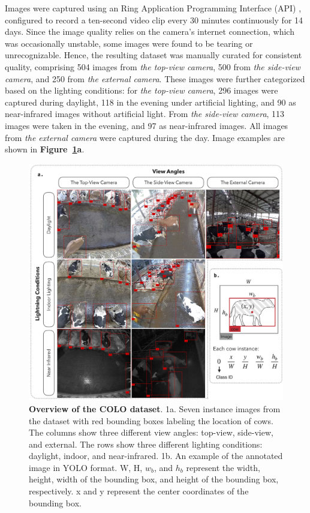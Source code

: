 Images were captured using an Ring Application Programming Interface (API) \citep{greif_dgreifring_2024}, configured to record a ten-second video clip every 30 minutes continuously for 14 days. Since the image quality relies on the camera's internet connection, which was occasionally unstable, some images were found to be tearing or unrecognizable. Hence, the resulting dataset was manually curated for consistent quality, comprising 504 images from \textit{the top-view camera}, 500 from \textit{the side-view camera}, and 250 from \textit{the external camera}. These images were further categorized based on the lighting conditions: for \textit{the top-view camera}, 296 images were captured during daylight, 118 in the evening under artificial lighting, and 90 as near-infrared images without artificial light. From \textit{the side-view camera}, 113 images were taken in the evening, and 97 as near-infrared images. All images from \textit{the external camera} were captured during the day. Image examples are shown in \textbf{Figure~\ref{fig:dataset}a}.

\begin{figure}[h]
    \centering
    \includegraphics[width=1\textwidth]{figure_1.jpg}
    \caption{\textbf{Overview of the COLO dataset}. 1a. Seven instance images from the dataset with red bounding boxes labeling the location of cows. The columns show three different view angles: top-view, side-view, and external. The rows show three different lighting conditions: daylight, indoor, and near-infrared. 1b. An example of the annotated image in YOLO format. W, H, $w_b$, and $h_b$ represent the width, height, width of the bounding box, and height of the bounding box, respectively. x and y represent the center coordinates of the bounding box.} 
    \label{fig:dataset}
\end{figure}


